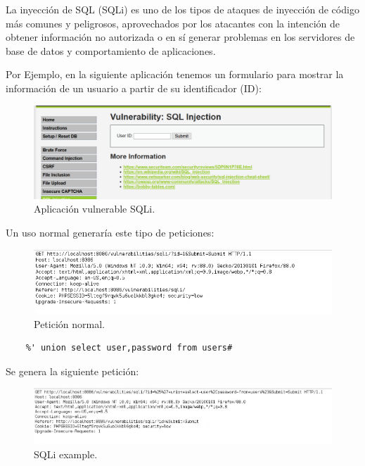 La inyección de SQL (SQLi) es uno de los tipos de ataques de inyección de código más
comunes y peligrosos, aprovechados por los atacantes con la intención de obtener
información no autorizada o en sí generar problemas en los servidores de base de datos y
comportamiento de aplicaciones.

Por Ejemplo, en la siguiente aplicación tenemos un formulario para mostrar 
la información de un usuario a partir de su identificador (ID):

\begin{figure}[h!]  
    \includegraphics[width=\linewidth]{./imagenes/013_SQLi_Example_1.png}
    \caption{Aplicación vulnerable SQLi.}  
    \label{fig:SQLi 1}
\end{figure}

Un uso normal generaría este tipo de peticiones:

\begin{figure}[h!]  
    \includegraphics[width=\linewidth]{./imagenes/013_SQLi_Example_2.png}
    \caption{Petición normal.}  
    \label{fig:SQLi 2}
\end{figure}

\begin{verbatim}
    %' union select user,password from users# 
\end{verbatim}

Se genera la siguiente petición:

\begin{figure}[h!]  
    \includegraphics[width=\linewidth]{./imagenes/013_SQLi_Example_3.png}
    \caption{SQLi example.}  
    \label{fig:SQLi 3}
\end{figure}

